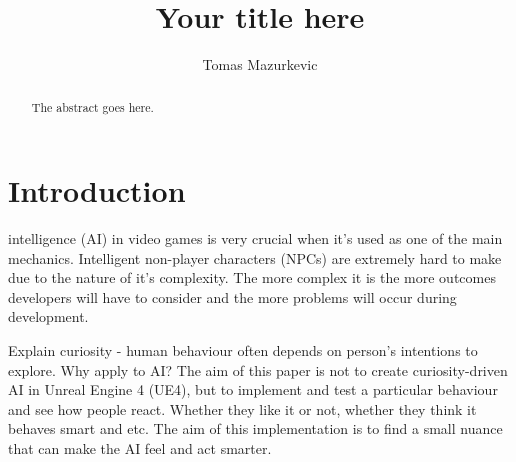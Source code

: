 \documentclass[journal]{IEEEtran}
\begin{document}
%
\title{Your title here}
%
%
\author{Tomas Mazurkevic}


\maketitle

\begin{abstract}
The abstract goes here.
\end{abstract}

\section{Introduction}
% 
% 
% 
% 
 intelligence (AI) in video games is very crucial when it's used as one of the main mechanics. Intelligent non-player characters (NPCs) are extremely hard to make due to the nature of it's complexity. The more complex it is the more outcomes developers will have to consider and the more problems will occur during development. 

Explain curiosity - human behaviour often depends on person's intentions to explore. Why apply to AI? The aim of this paper is not to create curiosity-driven AI in Unreal Engine 4 (UE4), but to implement and test a particular behaviour and see how people react. Whether they like it or not, whether they think it behaves smart and etc. The aim of this implementation is to find a small nuance that can make the AI feel and act smarter.
\end{document}
